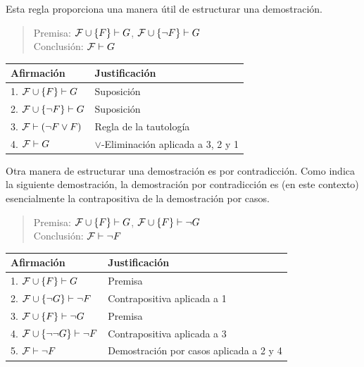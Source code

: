 \message{ !name(main.tex)}\documentclass[12pt,a4paper]{book}
\makeatletter
\newenvironment{derivacion}{%
  \begingroup
  \renewcommand{\arraystretch}{1.35}
  \begin{center}
  \begin{tabular}{@{}l l@{}}
    \textbf{Afirmación} & \textbf{Justificación}\\
    \hline
}{%
  \end{tabular}
  \end{center}
  \endgroup
}
\makeatother
\begin{document}
    \begin{ejemplo}\label{ej:demostracion-por-casos}
        Esta regla proporciona una manera útil de estructurar una demostración.

        \begin{quote}
            Premisa: $\mathcal{F}\cup\{F\}\vdash G$, $\mathcal{F}\cup\{\neg F\}\vdash G$\\
            Conclusión: $\mathcal{F}\vdash G$
        \end{quote}

        \begin{derivacion}
            1. $\mathcal{F}\cup\{F\}\vdash G$ & Suposición\\
            2. $\mathcal{F}\cup\{\neg F\}\vdash G$ & Suposición\\
            3. $\mathcal{F}\vdash(\neg F\vee F)$ & Regla de la tautología\\
            4. $\mathcal{F}\vdash G$ & $\vee$-Eliminación aplicada a 3, 2 y 1\\
        \end{derivacion}
    \end{ejemplo}

    \begin{ejemplo}\label{ej:demostracion-por-contradiccion}
        Otra manera de estructurar una demostración es por contradicción. Como indica la siguiente demostración, la demostración
        por contradicción es (en este contexto) esencialmente la contrapositiva de la demostración por casos.

        \begin{quote}
            Premisa: $\mathcal{F}\cup\{F\}\vdash G$, $\mathcal{F}\cup\{F\}\vdash\neg G$\\
            Conclusión: $\mathcal{F}\vdash\neg F$
        \end{quote}

        \begin{derivacion}
            1. $\mathcal{F}\cup\{F\}\vdash G$ & Premisa\\
            2. $\mathcal{F}\cup\{\neg G\}\vdash\neg F$ & Contrapositiva aplicada a 1\\
            3. $\mathcal{F}\cup\{F\}\vdash\neg G$ & Premisa\\
            4. $\mathcal{F}\cup\{\neg\neg G\}\vdash\neg F$ & Contrapositiva aplicada a 3\\
            5. $\mathcal{F}\vdash\neg F$ & Demostración por casos aplicada a 2 y 4\\
        \end{derivacion}
    \end{ejemplo}
\end{document}
